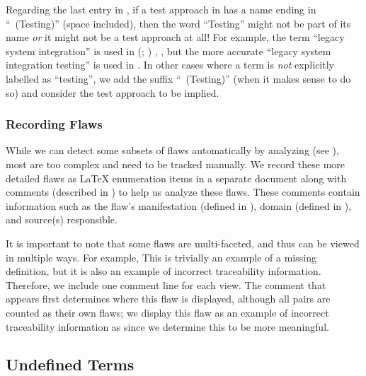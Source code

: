     Regarding the last entry in , if a test approach in
    \ourApproachGlossary{} has a name ending in ``~(Testing)'' (space
    included), then the word ``Testing'' might not be part of its name
    \emph{or} it might not be a test approach at all! For example, the term
    ``legacy system integration'' is used in \ifnotpaper
        \citeauthor{Gerrard2000a} (\citeyear[pp.~12\==13, Tab.~2]{Gerrard2000a};
        \citeyear[Tab.~1]{Gerrard2000b})\else
        \cite[pp.~12\==13, Tab.~2]{Gerrard2000a},
        \cite[Tab.~1]{Gerrard2000b}\fi, but the more accurate
    ``legacy system integration testing'' is used in
    \citeyearpar[pp.~30\==31]{Gerrard2000b}. In other cases where a
    term is \emph{not} explicitly labelled as ``testing'', we add the
    suffix ``~(Testing)'' (when it makes sense to do so) and consider
    the test approach to be implied.

    \clearpage
    \subsubsection{Recording Flaws}\label{record-flaws}
    While we can detect some subsets of flaws automatically by analyzing
    \ourApproachGlossary{} (see ), most
    are too complex and need to be tracked manually. We record these more
    detailed flaws as \LaTeX{} enumeration items in a separate document along
    with comments (described in ) to help us analyze
    these flaws. These comments contain information such as the flaw's
    manifestation (defined in ), domain (defined in
    ), and source(s) responsible.

    \label{multi-view-flaws}
    It is important to note that some flaws are multi-faceted, and thus can be
    viewed in multiple ways. For example,\seeRefMissing*{} This is trivially an
    example of a missing definition, but it is also an example of incorrect
    traceability information. Therefore, we include one comment line for each
    view.
    The comment that appears first determines where this flaw is displayed,
    although all pairs are counted as their own flaws; we display this flaw
    as an example of incorrect traceability information as
     since we determine this to be more meaningful.
\fi

\subsection{Undefined Terms}\label{undef-terms}

